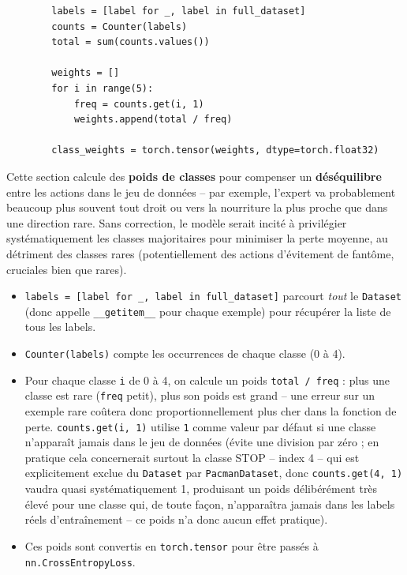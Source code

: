 \documentclass[a4paper,12pt]{article}
\begin{document}
\begin{lstlisting}
        labels = [label for _, label in full_dataset]
        counts = Counter(labels)
        total = sum(counts.values())

        weights = []
        for i in range(5):
            freq = counts.get(i, 1)
            weights.append(total / freq)

        class_weights = torch.tensor(weights, dtype=torch.float32)
\end{lstlisting}

Cette section calcule des \textbf{poids de classes} pour compenser un
\textbf{déséquilibre} entre les actions dans le jeu de données -- par
exemple, l'expert va probablement beaucoup plus souvent tout droit ou
vers la nourriture la plus proche que dans une direction rare. Sans
correction, le modèle serait incité à privilégier systématiquement les
classes majoritaires pour minimiser la perte moyenne, au détriment des
classes rares (potentiellement des actions d'évitement de fantôme,
cruciales bien que rares).

\begin{itemize}
    \item \texttt{labels = [label for \_, label in full\_dataset]}
    parcourt \emph{tout} le \texttt{Dataset} (donc appelle
    \texttt{\_\_getitem\_\_} pour chaque exemple) pour récupérer la
    liste de tous les labels.
    \item \texttt{Counter(labels)} compte les occurrences de chaque
    classe (0 à 4).
    \item Pour chaque classe \texttt{i} de 0 à 4, on calcule un poids
    \texttt{total / freq} : plus une classe est rare (\texttt{freq}
    petit), plus son poids est grand -- une erreur sur un exemple rare
    coûtera donc proportionnellement plus cher dans la fonction de perte.
    \texttt{counts.get(i, 1)} utilise \texttt{1} comme valeur par défaut
    si une classe n'apparaît jamais dans le jeu de données (évite une
    division par zéro ; en pratique cela concernerait surtout la classe
    STOP -- index 4 -- qui est explicitement exclue du \texttt{Dataset}
    par \texttt{PacmanDataset}, donc \texttt{counts.get(4, 1)} vaudra
    quasi systématiquement 1, produisant un poids délibérément très
    élevé pour une classe qui, de toute façon, n'apparaîtra jamais dans
    les labels réels d'entraînement -- ce poids n'a donc aucun effet
    pratique).
    \item Ces poids sont convertis en \texttt{torch.tensor} pour être
    passés à \texttt{nn.CrossEntropyLoss}.
\end{itemize}
\end{document}
